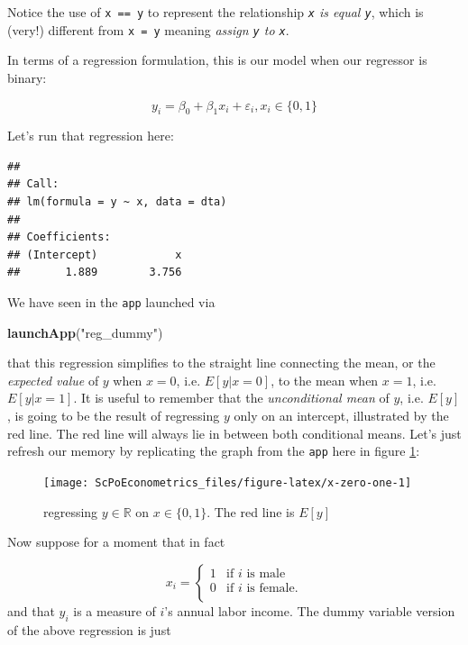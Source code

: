 \documentclass[]{book}
\newenvironment{Shaded}{\begin{snugshade}}{\end{snugshade}}
\newcommand{\KeywordTok}[1]{\textcolor[rgb]{0.13,0.29,0.53}{\textbf{#1}}}
\newcommand{\StringTok}[1]{\textcolor[rgb]{0.31,0.60,0.02}{#1}}
\newcommand{\NormalTok}[1]{#1}
\theoremstyle{definition}
\theoremstyle{definition}
\theoremstyle{definition}
\theoremstyle{remark}
\begin{document}
Notice the use of \texttt{x\ ==\ y} to represent the relationship
\emph{\texttt{x} is equal \texttt{y}}, which is (very!) different from
\texttt{x\ =\ y} meaning \emph{assign \texttt{y} to \texttt{x}}.

In terms of a regression formulation, this is our model when our
regressor is binary:

\[
y_i = \beta_0 + \beta_1 x_i + \varepsilon_i,x_i\in\{0,1\} \label{eq:zero-one-reg}
\]

Let's run that regression here:

\begin{verbatim}
## 
## Call:
## lm(formula = y ~ x, data = dta)
## 
## Coefficients:
## (Intercept)            x  
##       1.889        3.756
\end{verbatim}

We have seen in the \texttt{app} launched via

\begin{Shaded}
\begin{Highlighting}[]
\KeywordTok{launchApp}\NormalTok{(}\StringTok{"reg_dummy"}\NormalTok{)}
\end{Highlighting}
\end{Shaded}

that this regression simplifies to the straight line connecting the
mean, or the \emph{expected value} of \(y\) when \(x=0\), i.e.
\(E[y|x=0]\), to the mean when \(x=1\), i.e. \(E[y|x=1]\). It is useful
to remember that the \emph{unconditional mean} of \(y\), i.e. \(E[y]\),
is going to be the result of regressing \(y\) only on an intercept,
illustrated by the red line. The red line will always lie in between
both conditional means. Let's just refresh our memory by replicating the
graph from the \texttt{app} here in figure \ref{fig:x-zero-one}:

\begin{figure}

{\centering \texttt{[image: ScPoEconometrics\_files/figure-latex/x-zero-one-1]} 

}

\caption{regressing $y \in \mathbb{R}$ on $x \in \{0,1\}$. The red line is $E[y]$}\label{fig:x-zero-one}
\end{figure}

Now suppose for a moment that in fact

\[
x_i = \begin{cases}
          1 & \text{if }i\text{ is male} \\
            0 & \text{if }i\text{ is female}. \\
   \end{cases}
\] and that \(y_i\) is a measure of \(i\)'s annual labor income. The
dummy variable version of the above regression is just
\end{document}
